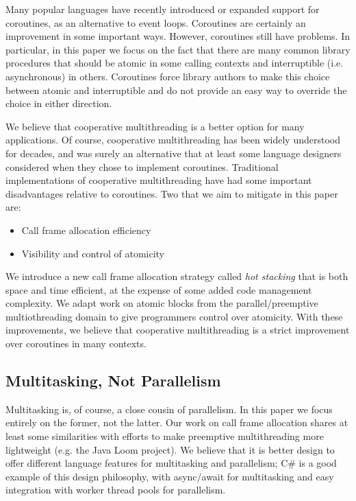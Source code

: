 \documentclass[a4paper,UKenglish,cleveref, autoref]{lipics-v2019}
\begin{document}
Many popular languages have recently introduced or expanded support for coroutines, as an alternative to event loops.
Coroutines are certainly an improvement in some important ways.
However, coroutines still have problems.
In particular, in this paper we focus on the fact that there are many common library procedures that should be atomic in some calling contexts and interruptible (i.e. asynchronous) in others.
Coroutines force library authors to make this choice between atomic and interruptible and do not provide an easy way to override the choice in either direction.

We believe that cooperative multithreading is a better option for many applications.
Of course, cooperative multithreading has been widely understood for decades, and was surely an alternative that at least some language designers considered when they chose to implement coroutines.
Traditional implementations of cooperative multithreading have had some important disadvantages relative to coroutines.
Two that we aim to mitigate in this paper are:
\begin{itemize}
\item Call frame allocation efficiency
\item Visibility and control of atomicity
\end{itemize}

We introduce a new call frame allocation strategy called \emph{hot stacking} that is both space and time efficient, at the expense of some added code management complexity.
We adapt work on atomic blocks from the parallel{\slash}preemptive multiothreading domain to give programmers control over atomicity.
With these improvements, we believe that cooperative multithreading is a strict improvement over coroutines in many contexts.

\subsection{Multitasking, Not Parallelism}

Multitasking is, of course, a close cousin of parallelism.
In this paper we focus entirely on the former, not the latter.
Our work on call frame allocation shares at least some similarities with efforts to make preemptive multithreading more lightweight (e.g. the Java Loom project).
We believe that it is better design to offer different language features for multitasking and parallelism; C\# is a good example of this design philosophy, with async/await for multitasking and easy integration with worker thread pools for parallelism.
\end{document}
